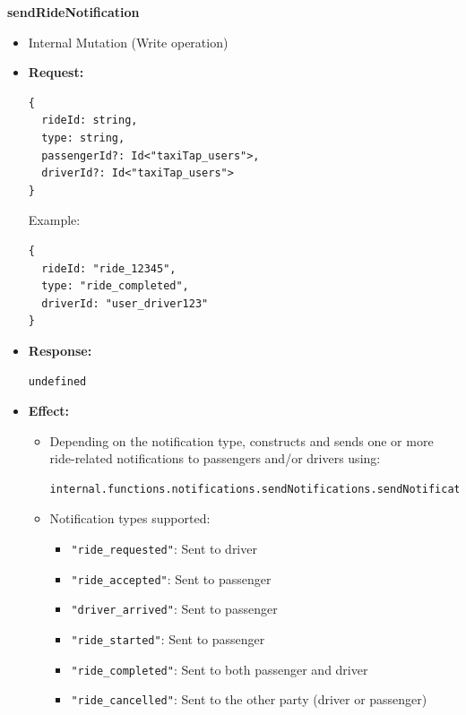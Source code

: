 \documentclass[a4paper,12pt]{article}
\begin{document}
\item \textbf{sendRideNotification}
  \begin{itemize}
    \item Internal Mutation (Write operation)
    \item \textbf{Request:}
    \begin{verbatim}
{
  rideId: string,
  type: string,
  passengerId?: Id<"taxiTap_users">,
  driverId?: Id<"taxiTap_users">
}
    \end{verbatim}
    Example:
    \begin{verbatim}
{
  rideId: "ride_12345",
  type: "ride_completed",
  driverId: "user_driver123"
}
    \end{verbatim}
    \item \textbf{Response:}
    \begin{verbatim}
undefined
    \end{verbatim}
    \item \textbf{Effect:}
    \begin{itemize}
      \item Depending on the notification type, constructs and sends one or more ride-related notifications to passengers and/or drivers using:
      \begin{verbatim}
internal.functions.notifications.sendNotifications.sendNotificationInternal
      \end{verbatim}
      \item Notification types supported:
        \begin{itemize}
          \item \texttt{"ride_requested"}: Sent to driver
          \item \texttt{"ride_accepted"}: Sent to passenger
          \item \texttt{"driver_arrived"}: Sent to passenger
          \item \texttt{"ride_started"}: Sent to passenger
          \item \texttt{"ride_completed"}: Sent to both passenger and driver
          \item \texttt{"ride_cancelled"}: Sent to the other party (driver or passenger)
        \end{itemize}
    \end{itemize}
  \end{itemize}
\end{document}
